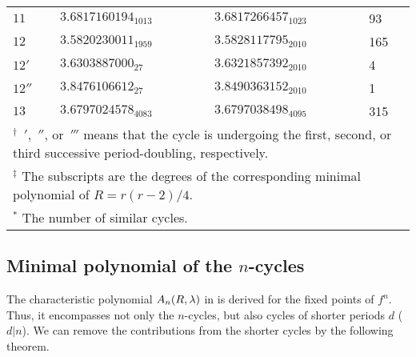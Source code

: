 \documentclass{ws-ijbc}
\begin{document}
\begin{table}[h]
{\begin{tabular}{llll}
$11$    & $3.6817160194_{1013}$ &  $3.6817266457_{1023}$  & 93  \\
$12$    & $3.5820230011_{1959}$ &  $3.5828117795_{2010}$  & 165 \\
$12'$   & $3.6303887000_{27}$   &  $3.6321857392_{2010}$  & 4   \\
$12''$  & $3.8476106612_{27}$   &  $3.8490363152_{2010}$  & 1   \\
$13$    & $3.6797024578_{4083}$ &  $3.6797038498_{4095}$  & 315 \\
\hline
\multicolumn{4}{p{\linewidth}}{
$^\dagger$
  $\,'$, $\,''$, or $\,'''$ means
    that the cycle is undergoing
    the first, second, or third successive period-doubling, respectively.
} \\
\multicolumn{4}{p{\linewidth}}{
$^\ddagger$
  The subscripts are the degrees of the corresponding minimal polynomial
    of $R = r(r-2)/4$.
} \\
\multicolumn{4}{p{\linewidth}}{
$^*$
  The number of similar cycles.
} \\
\hline
\end{tabular}
\label{tab:rval}
}
\end{table}







\subsection{\label{sec:primfac}Minimal polynomial of the $n$-cycles}


The characteristic polynomial $A_n(R, \lambda)$ in 
  is derived for the fixed points of $f^n$.
Thus, it encompasses not only the $n$-cycles,
  but also cycles of shorter periods $d$ ($d|n$).
%
We can remove the contributions from the shorter cycles by the following theorem.
\end{document}
